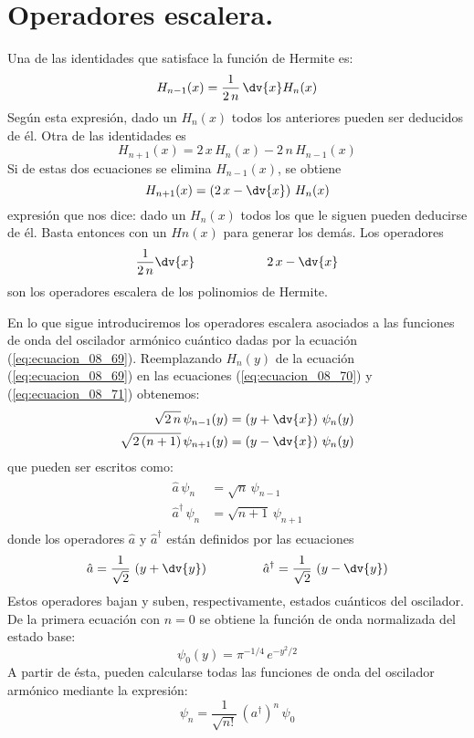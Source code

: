 \section{Operadores escalera.}
Una de las identidades que satisface la función de Hermite es:
\begin{equation}
H_{n-1} (x) = \dfrac{1}{2 \, n} \, \dv{x} H_{n} (x)
\label{eq:ecuacion_08_70}
\end{equation}
Según esta expresión, dado un $H_{n} (x)$ todos los anteriores pueden ser deducidos de él. Otra de las identidades es
\[ H_{n+1} (x) = 2 \, x \, H_{n} (x) - 2 \, n \, H_{n-1} (x) \]
Si de estas dos ecuaciones se elimina $H_{n-1} (x)$, se obtiene
\begin{equation}
H_{n+1} (x) = \left( 2 \, x - \dv{x} \right) \, H_{n} (x)
\label{eq:ecuacion_08_71}
\end{equation}
expresión que nos dice: dado un $H_{n} (x)$ todos los que le siguen pueden deducirse de él. Basta entonces con un $Hn(x)$ para generar los demás. Los operadores 
\[ \dfrac{1}{2 \, n} \dv{x} \hspace{2cm} 2 \, x - \dv{x} \]
son los operadores escalera de los polinomios de Hermite.
\par
En lo que sigue introduciremos los operadores escalera asociados a las funciones de onda del oscilador armónico cuántico dadas por la ecuación (\ref{eq:ecuacion_08_69}). Reemplazando $H_{n} (y)$ de la ecuación (\ref{eq:ecuacion_08_69}) en las ecuaciones (\ref{eq:ecuacion_08_70}) y (\ref{eq:ecuacion_08_71}) obtenemos:
\begin{align*}
\sqrt{2 \, n} \, \psi_{n-1} (y) &= \left( y + \dv{x} \right) \, \psi_{n} (y) \\
\sqrt{2 \, (n + 1)} \, \psi_{n+1} (y) &= \left( y - \dv{x} \right) \, \psi_{n} (y)
\end{align*}
que pueden ser escritos como:
\begin{align}
\begin{aligned}
\hat{a} \, \psi_{n} &= \sqrt{n} \, \psi_{n-1} \\
\hat{a}^{\dagger} \, \psi_{n} &= \sqrt{n+1} \, \psi_{n+1}
\end{aligned}
\label{eq:ecuacion_08_72}
\end{align}
donde los operadores $\hat{a}$ y $\hat{a}^{\dagger}$ están definidos por las ecuaciones
\[ \hat{a} = \dfrac{1}{\sqrt{2}} \, \left( y + \dv{y} \right) \hspace{1.5cm} \hat{a}^{\dagger} = \dfrac{1}{\sqrt{2}} \, \left( y - \dv{y} \right) \]
Estos operadores bajan y suben, respectivamente, estados cuánticos del oscilador. De la primera ecuación con $n = 0$ se obtiene la función de onda normalizada del estado base:
\[ \psi_{0} (y) = \pi^{-1/4} \, e^{-y^{2}/2} \]
A partir de ésta, pueden calcularse todas las funciones de onda del oscilador armónico mediante la expresión:
\begin{equation}
\psi_{n} = \dfrac{1}{\sqrt{n!}} \, \left( a^{\dagger} \right)^{n} \, \psi_{0}
\label{eq:ecuacion_08_73}
\end{equation}
